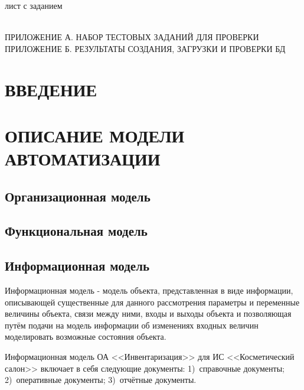 \documentclass[12pt, a4paper, simple]{eskdtext}
\begin{document}
    

    лист с заданием
    \newpage

    \tableofcontents
    \thispagestyle{toc}
    \pagestyle{toc}
    \hspace{0pt}\\
    ПРИЛОЖЕНИЕ А. НАБОР ТЕСТОВЫХ ЗАДАНИЙ ДЛЯ ПРОВЕРКИ\\
    ПРИЛОЖЕНИЕ Б. РЕЗУЛЬТАТЫ СОЗДАНИЯ, ЗАГРУЗКИ И ПРОВЕРКИ БД\\
    \newpage

    \newpage
    \section*{ВВЕДЕНИЕ}
    \newpage

    \section{ОПИСАНИЕ МОДЕЛИ АВТОМАТИЗАЦИИ}
    \subsection{Организационная модель}
    \subsection{Функциональная модель}

    \newpage
    \subsection{Информационная модель}
    Информационная модель - модель объекта, представленная в виде информации,
    описывающей существенные для данного рассмотрения параметры и переменные величины объекта,
    связи между ними, входы и выходы объекта и позволяющая путём подачи на модель информации об изменениях
    входных величин моделировать возможные состояния объекта.

    Информационная модель ОА <<Инвентаризация>> для ИС <<Косметический салон>> включает в себя следующие документы:
    1)~справочные документы; 2)~оперативные документы; 3)~отчётные документы.

\end{document}
